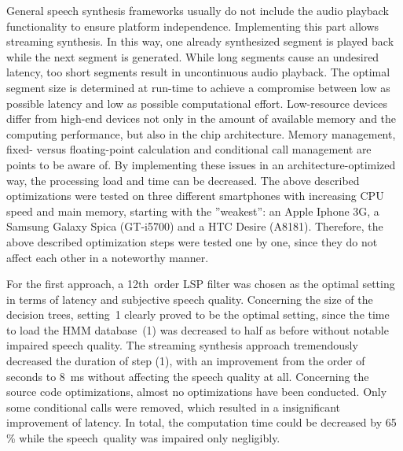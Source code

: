 \begin{table}[h]
	\caption{Test settings of optimization approach B)~\cite{toth:optimizing}}
	\vspace{-0.75em}
	\label{tab:settings}
	\vspace{-0.5em}
\end{table}

General speech synthesis frameworks usually do not include the audio playback functionality to ensure platform independence. Implementing this part allows streaming synthesis. In this way, one already synthesized segment is played back while the next segment is generated. While long segments cause an undesired latency, too short segments result in uncontinuous audio playback. The optimal segment size is determined at run-time to achieve a compromise between low as possible latency and low as possible \break computational effort. Low-resource devices differ from high-end devices not only in the amount of available memory and the computing performance, but also in the chip architecture. Memory management, fixed- versus floating-point calculation and conditional call management are points to be aware of. By implementing these issues in an architecture-optimized way, the processing load and time can be decreased. The above described optimizations were tested on three different smartphones with increasing CPU speed and main memory, starting with the ''weakest'': an Apple Iphone 3G, a Samsung Galaxy Spica (GT-i5700) and a HTC Desire (A8181). Therefore, the above described optimization steps were tested one by one, since they do not affect each other in a noteworthy manner.

For the first approach, a 12th~order \ac{LSP} filter was chosen as the optimal setting in terms of latency and subjective speech quality. Concerning the size of the decision trees, setting~1 clearly proved to be the optimal setting, since the time to load the \ac{HMM} database~(1) was decreased to half as before without notable impaired speech quality. The streaming synthesis approach tremendously decreased the duration of step (1), with an improvement from the order of seconds to 8~ms without affecting the speech quality at all. Concerning the source code optimizations, almost no optimizations have been conducted. Only some conditional calls were removed, which resulted in a insignificant improvement of latency. In total, the computation time could be decreased by 65\,\% while the speech~quality was impaired only negligibly.

